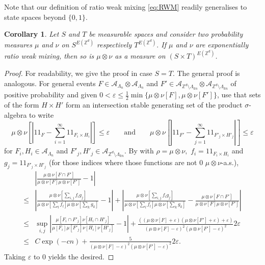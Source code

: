 \documentclass[article,11pt,reqno]{amsart}
\newcommand{\id}{1\! \!1}
\newtheorem{corollary}[theorem]{Corollary}
\begin{document}
Note that our definition of ratio weak mixing \eqref{eq:RWM} readily generalises to state spaces beyond $\{0,1\}.$ 

\begin{corollary} \label{Stable_RWM} Let $S$ and $T$ be measurable spaces and consider two probability measures $\mu$ and $\nu$ on $S^{E(\mathbb{Z}^d)}$ respectively $T^{E(\mathbb{Z}^d)}.$ If $\mu$ and $\nu$ are exponentially ratio weak mixing, then so is $\mu\otimes \nu$ as a measure on $(S\times T)^{E(\mathbb{Z}^d)}$.
\end{corollary}
\begin{proof}
For readability, we give the proof in case $S=T.$ The general proof is analogous.
For general events $F\in \mathcal{A}_{\Lambda_n}\otimes\mathcal{A}_{\Lambda_n}$ and $F'\in \mathcal{A}_{\mathbb{Z}^d\setminus \Lambda_{kn}}\otimes \mathcal{A}_{\mathbb{Z}^d\setminus \Lambda_{kn}}$ of positive probability and given $0<\varepsilon\leq \frac{1}{2}\min \{\mu\otimes \nu[F],\mu\otimes \nu[F']\} $, use that sets of the form $H\times H'$ form an intersection stable generating set of the product $\sigma$-algebra to write
$$
\mu\otimes \nu\left[\left|\id_F-\sum_{i=1}^{\infty} \id_{F_i\times H_i}\right|\right]\leq  \varepsilon \qquad  \mathrm{and}\qquad  \mu\otimes \nu \left[\left|\id_{F'}-\sum_{j=1}^{\infty} \id_{F'_j\times H'_j}\right|\right]\leq \varepsilon
$$
for $F_i,H_i\in \mathcal{A}_{\Lambda_n}$ and $F'_j,H'_j\in \mathcal{A}_{\mathbb{Z}^d\setminus \Lambda_{kn}}$. By  with $\rho=\mu\otimes \nu,$ $f_i=\id_{F_i\times H_i}$ and $g_j=\id_{F'_j\times H'_j}$ (for those indices where those functions are not $0$ $\mu\otimes \nu$-a.s.), 
\begin{align*}
    &\left|\frac{\mu\otimes \nu[F\cap F']}{\mu\otimes \nu[F]\mu\otimes \nu[F']}-1\right|\\
    \leq & \left|\frac{\mu\otimes\nu[\sum_{i,j} f_ig_j]}{\mu\otimes \nu[\sum_l f_l]\mu\otimes \nu[\sum_k g_k]}-1\right| + \left|\frac{\mu\otimes\nu[\sum_{i,j} f_ig_j]}{\mu\otimes \nu[\sum_l f_l]\mu\otimes \nu[\sum_k g_k]}-\frac{\mu\otimes\nu[F\cap F']}{\mu\otimes \nu[ F]\mu\otimes \nu[F']}\right| \\
    \leq & \sup_{i,j} \left|\frac{\mu[F_i\cap F'_j]\nu[H_i\cap H'_j]}{\mu[F_i]\mu[F'_j]\nu[H_i]\nu[H'_j]} -1\right|+\frac{((\mu\otimes \nu[F]+\varepsilon)(\mu\otimes \nu[F']+\varepsilon)+\varepsilon)}{(\mu\otimes\nu[F]-\varepsilon)^2(\mu\otimes \nu[F']-\varepsilon)^2}2\varepsilon \\
    \leq& C\exp(-c n)+\frac{5}{(\mu\otimes\nu[F]-\varepsilon)^2(\mu\otimes \nu[F']-\varepsilon)^2}2\varepsilon.
\end{align*}
Taking $\varepsilon$ to $0$ yields the desired.

\end{proof}
\end{document}
